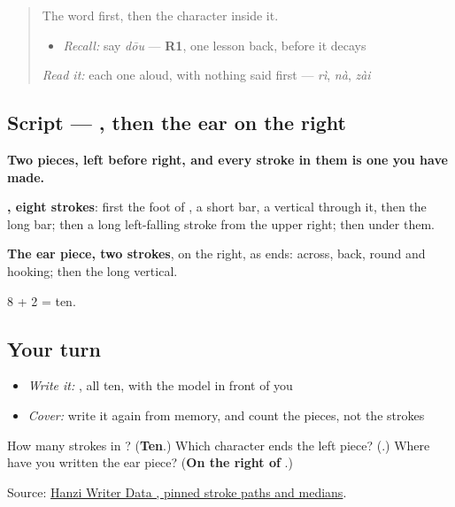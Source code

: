 \begin{quote}
The word first, then the character inside it.

\begin{itemize}
\raggedright
  \item \emph{Recall:} say \emph{dōu} — \textbf{R1}, one lesson back, before it decays
\end{itemize}

\begin{quote}
  
\end{quote}

\emph{Read it:} each one aloud, with nothing said first — \emph{rì}, \emph{nà}, \emph{zài}
\end{quote}

\subsection*{Script — , then the ear on the right}

\begin{quote}
\end{quote}

\textbf{Two pieces, left before right, and every stroke in them is one you have made.}

\textbf{, eight strokes}: first the foot of , a short bar, a vertical through it, then the long bar; then a long left-falling stroke from the upper right; then  under them.

\textbf{The ear piece, two strokes}, on the right, as  ends: across, back, round and hooking; then the long vertical.

8 + 2 = ten.

\subsection*{Your turn}
\begin{itemize}
\raggedright
  \item \emph{Write it:} , all ten, with the model in front of you
  \item \emph{Cover:} write it again from memory, and count the pieces, not the strokes
\end{itemize}

\begin{tcolorbox}[breakable,colback=teal!4,colframe=teal!35!black,title={Before you move on}]
How many strokes in ? (\textbf{Ten}.) Which character ends the left piece? (\textbf{}.) Where have you written the ear piece? (\textbf{On the right of }.)

Source: \href{https://raw.githubusercontent.com/chanind/hanzi-writer-data/68d10a4b21150cae5e1ebbd223eed289cf32d90c/data/\%E9\%83\%BD.json}{Hanzi Writer Data , pinned stroke paths and medians}.
\end{tcolorbox}
